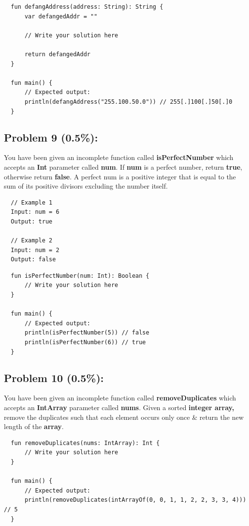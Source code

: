 \documentclass{article}
\begin{document}
\begin{verbatim}
  fun defangAddress(address: String): String {
      var defangedAddr = ""
      
      // Write your solution here
      
      return defangedAddr
  }

  fun main() {
      // Expected output:
      println(defangAddress("255.100.50.0")) // 255[.]100[.]50[.]0
  }
\end{verbatim}

\subsection*{Problem 9 (0.5\%):}
You have been given an incomplete function called \textbf{isPerfectNumber} which accepts an \textbf{Int} parameter called \textbf{num}. If \textbf{num} is a perfect number, return \textbf{true}, otherwise return \textbf{false}. A perfect num is a positive integer that is equal to the sum of its positive divisors excluding the number itself.

\begin{verbatim}
  // Example 1
  Input: num = 6
  Output: true

  // Example 2
  Input: num = 2
  Output: false
\end{verbatim}

\begin{verbatim}
  fun isPerfectNumber(num: Int): Boolean {
      // Write your solution here
  }

  fun main() {
      // Expected output:
      println(isPerfectNumber(5)) // false
      println(isPerfectNumber(6)) // true
  }
\end{verbatim}

\subsection*{Problem 10 (0.5\%):}
You have been given an incomplete function called \textbf{removeDuplicates} which accepts an \textbf{IntArray} parameter called \textbf{nums}. Given a sorted \textbf{integer array,} remove the duplicates such that each element occurs only once \& return the new length of the \textbf{array}.

\begin{verbatim}
  fun removeDuplicates(nums: IntArray): Int {
      // Write your solution here  
  }

  fun main() {
      // Expected output:
      println(removeDuplicates(intArrayOf(0, 0, 1, 1, 2, 2, 3, 3, 4))) // 5
  }
\end{verbatim}
\end{document}
